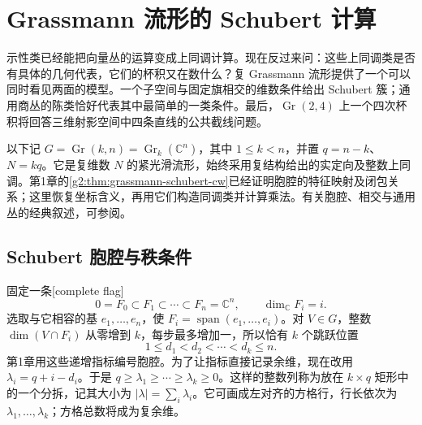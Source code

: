 
% 
% 
% 
% 
% 

\section{Grassmann 流形的 Schubert 计算}
\label{g2:sec:2105}

示性类已经能把向量丛的运算变成上同调计算。现在反过来问：这些上同调类是否有具体的几何代表，它们的杯积又在数什么？复 Grassmann 流形提供了一个可以同时看见两面的模型。一个子空间与固定旗相交的维数条件给出 Schubert 簇；通用商丛的陈类恰好代表其中最简单的一类条件。最后，\(\operatorname{Gr}(2,4)\) 上一个四次杯积将回答三维射影空间中四条直线的公共截线问题。

以下记 \(G=\operatorname{Gr}(k,n)=\operatorname{Gr}_k(\mathbb C^n)\)，其中 \(1\le k<n\)，并置 \(q=n-k\)、\(N=kq\)。它是复维数 \(N\) 的紧光滑流形，始终采用复结构给出的实定向及整数上同调。第1章的\cref{g2:thm:grassmann-schubert-cw}已经证明胞腔的特征映射及闭包关系；这里恢复坐标含义，再用它们构造同调类并计算乘法。有关胞腔、相交与通用丛的经典叙述，可参阅\cite[第1章第5节，The Cell Decomposition、The Schubert Calculus、Universal Bundles]{GriffithsHarris1994}。

\subsection{Schubert 胞腔与秩条件}
\label{g2:subsec:2105:01}
固定一条[complete flag]
\[
	0=F_0\subset F_1\subset\cdots\subset F_n=\mathbb C^n,
	\qquad\dim_{\mathbb C}F_i=i.
\]
选取与它相容的基 \(e_1,\ldots,e_n\)，使 \(F_i=\operatorname{span}(e_1,\ldots,e_i)\)。对 \(V\in G\)，整数 \(\dim(V\cap F_i)\) 从零增到 \(k\)，每步最多增加一，所以恰有 \(k\) 个跳跃位置
\[
	1\le d_1<d_2<\cdots<d_k\le n.
\]
第1章用这些递增指标编号胞腔。为了让指标直接记录余维，现在改用 \(\lambda_i=q+i-d_i\)。于是 \(q\ge\lambda_1\ge\cdots\ge\lambda_k\ge0\)。这样的整数列称为放在 \(k\times q\) 矩形中的一个分拆，记其大小为 \(|\lambda|=\sum_i\lambda_i\)。它可画成左对齐的方格行，行长依次为 \(\lambda_1,\ldots,\lambda_k\)；方格总数将成为复余维。

